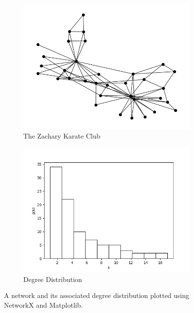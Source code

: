 \begin{figure}
    \begin{center}
        \begin{subfigure}[b]{0.45\textwidth}
            \includegraphics[width=\textwidth]{img/zachary_spring}
            \caption{The Zachary Karate Club}
            \label{fig:zachary_karate_club_degree}
        \end{subfigure}
        \begin{subfigure}[b]{0.45\textwidth}
            \includegraphics[width=\textwidth]{img/2/zachary_degree_hist}
            \caption{Degree Distribution}
            \label{fig:zachary_degree_distribution}
        \end{subfigure}
    \end{center}
    \caption{A network and its associated degree distribution plotted using NetworkX\cite{SciPyProceedings_11} and Matplotlib\cite{Hunter:2007}.}
    \label{fig:zachary_degree_diagram}
\end{figure}

